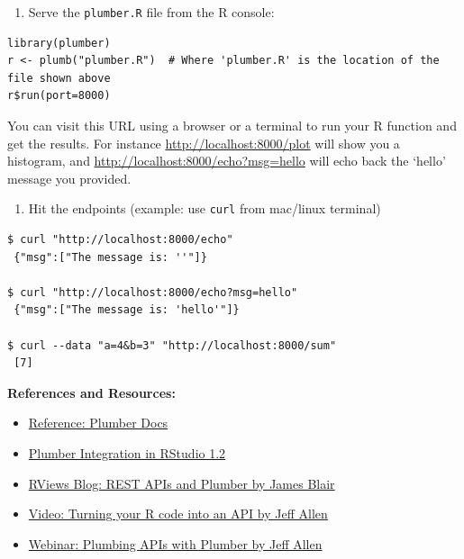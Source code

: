 \documentclass[]{book}
\providecommand{\tightlist}{%
  \setlength{\itemsep}{0pt}\setlength{\parskip}{0pt}}
\theoremstyle{definition}
\theoremstyle{definition}
\theoremstyle{definition}
\theoremstyle{remark}
\begin{document}
\begin{enumerate}
\def\labelenumi{\arabic{enumi}.}
\setcounter{enumi}{1}
\tightlist
\item
  Serve the \texttt{plumber.R} file from the R console:
\end{enumerate}

\begin{verbatim}
library(plumber)
r <- plumb("plumber.R")  # Where 'plumber.R' is the location of the file shown above
r$run(port=8000)
\end{verbatim}

You can visit this URL using a browser or a terminal to run your R
function and get the results. For instance
\url{http://localhost:8000/plot} will show you a histogram, and
\url{http://localhost:8000/echo?msg=hello} will echo back the `hello'
message you provided.

\begin{enumerate}
\def\labelenumi{\arabic{enumi}.}
\setcounter{enumi}{2}
\tightlist
\item
  Hit the endpoints (example: use \texttt{curl} from mac/linux terminal)
\end{enumerate}

\begin{verbatim}
$ curl "http://localhost:8000/echo"
 {"msg":["The message is: ''"]}
 
$ curl "http://localhost:8000/echo?msg=hello"
 {"msg":["The message is: 'hello'"]}
 
$ curl --data "a=4&b=3" "http://localhost:8000/sum"
 [7]
\end{verbatim}

\textbf{References and Resources:}

\begin{itemize}
\tightlist
\item
  \href{https://www.rplumber.io/}{Reference: Plumber Docs}
\item
  \href{https://blog.rstudio.com/2018/10/23/rstudio-1-2-preview-plumber-integration/}{Plumber
  Integration in RStudio 1.2}
\item
  \href{https://rviews.rstudio.com/2018/07/23/rest-apis-and-plumber/}{RViews
  Blog: REST APIs and Plumber by James Blair}
\item
  \href{https://www.rstudio.com/resources/videos/plumber-turning-your-r-code-into-an-api/}{Video:
  Turning your R code into an API by Jeff Allen}
\item
  \href{https://www.rstudio.com/resources/videos/plumbing-apis-with-plumber/}{Webinar:
  Plumbing APIs with Plumber by Jeff Allen}
\end{itemize}
\end{document}
